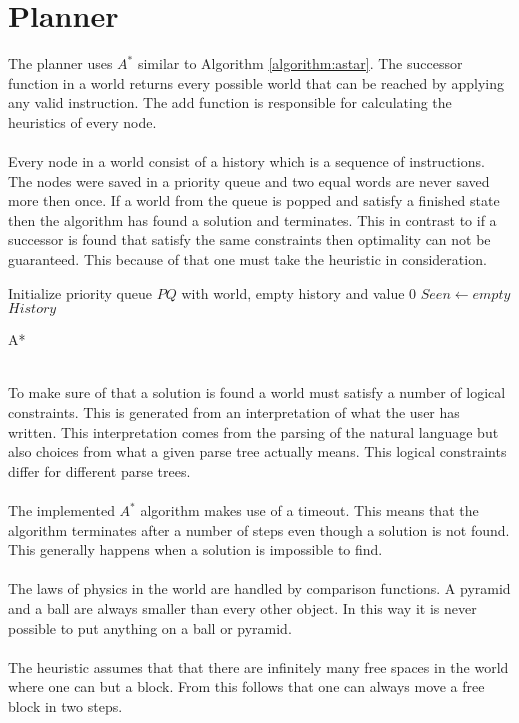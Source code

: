 \section{Planner}
The planner uses $A^*$ similar to Algorithm \ref{algorithm:astar}. The
successor function in a world returns every possible world that can be reached
by applying any valid instruction. The add function is responsible for
calculating the heuristics of every node.
\\\\
Every node in a world consist of a history which is a sequence of instructions. 
The nodes were saved in a priority queue and two equal words are never saved more
then once. If a world from the queue is popped and satisfy a finished state
then the algorithm has found a solution and terminates. This in contrast to if a
successor is found that satisfy the same constraints then optimality can not be
guaranteed. This because of that one must take the heuristic in consideration. \\ 
\begin{algorithm}[h!]
 \SetAlgoLined
 Initialize priority queue $PQ$ with world, empty history and value 0\;
 $Seen \leftarrow empty$\;
 \Return $History$
 \caption{A*}
 \label{algorithm:astar}
\end{algorithm} 
\\
To make sure of that a solution is found a world must satisfy a number of logical
constraints. This is generated from an interpretation of what the user has
written. This interpretation comes from the parsing of the natural language but 
also choices from what a given parse tree actually means. This logical
constraints differ for different parse trees.   
\\\\
The implemented $A^*$ algorithm makes use of a timeout. This means that 
the algorithm terminates after a number of steps even though a solution is not
found. This generally happens when a solution is impossible to find. 
\\\\
The laws of physics in the world are handled by comparison functions. A pyramid
and a ball are always smaller than every other object. In this way it is never
possible to put anything on a ball or pyramid. 
\\\\
The heuristic assumes that that there are infinitely many free spaces in the
world where one can but a block. From this follows that one can always move a
free block in two steps. 

